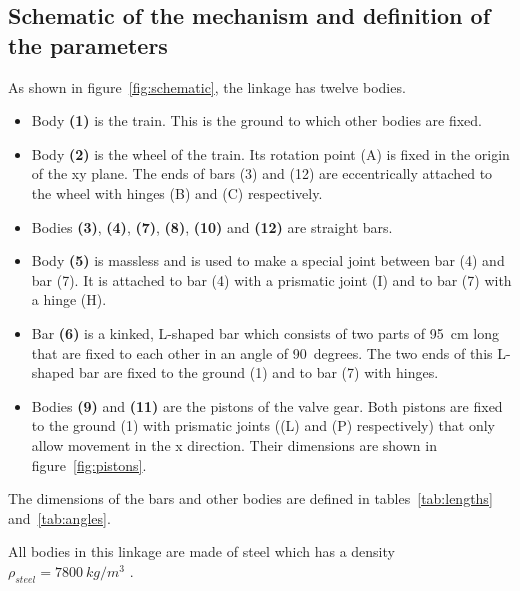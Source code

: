 \documentclass[a4paper]{article}
\begin{document}
\subsection{Schematic of the mechanism and definition of the parameters}

As shown in figure~\ref{fig:schematic}, the linkage has twelve bodies.

\begin{itemize}
	\item Body \textbf{(1)} is the train. This is the ground to which other bodies are fixed.
	\item Body \textbf{(2)} is the wheel of the train. Its rotation point (A) is fixed in the origin of the xy plane. The ends of bars (3) and (12) are eccentrically attached to the wheel with hinges (B) and (C) respectively.
	\item Bodies \textbf{(3)}, \textbf{(4)}, \textbf{(7)}, \textbf{(8)}, \textbf{(10)} and \textbf{(12)} are straight bars.
	\item Body \textbf{(5)} is massless and is used to make a special joint between bar (4) and bar (7). It is attached to bar (4) with a prismatic joint (I) and to bar (7) with a hinge (H).
	\item Bar \textbf{(6)} is a kinked, L-shaped bar which consists of two parts of 95~\si{cm} long that are fixed to each other in an angle of 90~\si{degrees}. The two ends of this L-shaped bar are fixed to the ground (1) and to bar (7) with hinges.
	\item Bodies \textbf{(9)} and \textbf{(11)} are the pistons of the valve gear. Both pistons are fixed to the ground (1) with prismatic joints ((L) and (P) respectively) that only allow movement in the x direction. Their dimensions are shown in figure~\ref{fig:pistons}.
\end{itemize}

The dimensions of the bars and other bodies are defined in tables~\ref{tab:lengths} and~\ref{tab:angles}.

All bodies in this linkage are made of steel which has a density \(\rho_{steel} = 7800~\si{kg/m^3}\) \cite{steel1}.
\end{document}
